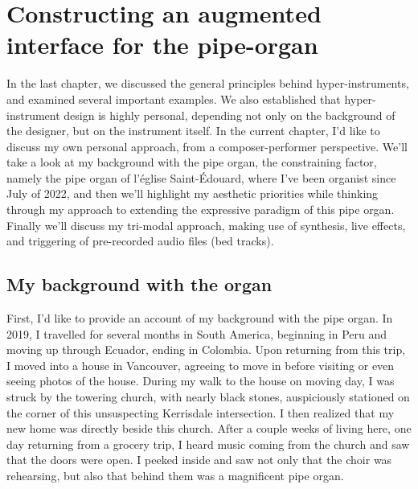 \documentclass[12pt,twoside,maitrise]{dms_ks}
\theoremstyle{definition}
\begin{document}
\chapter{Constructing an augmented interface for the pipe-organ}

In the last chapter, we discussed the general principles behind hyper-instruments, and examined several important examples. 
We also established that hyper-instrument design is highly personal, depending not only on the background of the designer, but on the instrument itself. 
In the current chapter, I'd like to discuss my own personal approach, from a composer-performer perspective. We'll take a look at my background with the pipe organ, the constraining factor, namely the pipe organ of l'église Saint-Édouard, where I've been organist since July of 2022, and then we'll highlight my aesthetic priorities while thinking through my approach to extending the expressive paradigm of this pipe organ. Finally we'll discuss my tri-modal approach, making use of synthesis, live effects, and triggering of pre-recorded audio files (bed tracks). 

\section{My background with the organ}

First, I’d like to provide an account of my background with the pipe organ.
In 2019, I travelled for several months in South America, beginning in Peru and moving up through Ecuador, ending in Colombia.
Upon returning from this trip, I moved into a house in Vancouver, agreeing to move in before visiting or even seeing photos of the house.
During my walk to the house on moving day, I was struck by the towering church, with nearly black stones, auspiciously stationed on the corner of this unsuspecting Kerrisdale intersection.
I then realized that my new home was directly beside this church.
After a couple weeks of living here, one day returning from a grocery trip, I heard music coming from the church and saw that the doors were open.
I peeked inside and saw not only that the choir was rehearsing, but also that behind them was a magnificent pipe organ.
\end{document}
